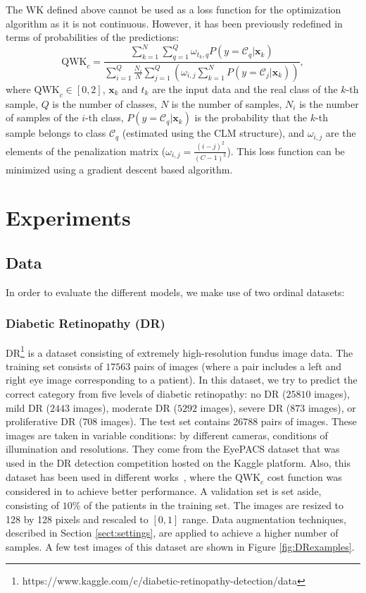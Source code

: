 \documentclass[journal]{IEEEtran}
\begin{document}
	The WK defined above cannot be used as a loss function for the optimization algorithm as it is not continuous. However, it has been previously redefined \cite{de2018weighted} in terms of probabilities of the predictions:
	\begin{equation}
	\nonumber
	\text{QWK}_c = \frac{\sum\limits_{k=1}^N \sum\limits_{q=1}^Q \omega_{t_k, q} P(y = \mathcal{C}_q | \mathbf{x}_k)}{\sum\limits_{i=1}^Q \frac{N_i}{N} \sum\limits_{j=1}^Q ( \omega_{i,j} \sum\limits_{k=1}^N P(y = \mathcal{C}_j | \mathbf{x}_k))},
	\end{equation}
	where $\text{QWK}_c \in [0,2]$, $\mathbf{x}_k$ and $t_k$ are the input data and the real class of the $k$-th sample, $Q$ is the number of classes, $N$ is the number of samples, $N_i$ is the number of samples of the $i$-th class, $P(y = \mathcal{C}_q | \mathbf{x}_k)$ is the probability that the $k$-th sample belongs to class $\mathcal{C}_q$ (estimated using the CLM structure), and $\omega_{i,j}$ are the elements of the penalization matrix ($\omega_{i,j} = \frac{(i-j)^2}{(C-1)^2}$). This loss function can be minimized using a gradient descent based algorithm.
	
	\section{Experiments}
	\label{sect:experiments}
	\subsection{Data}
	In order to evaluate the different models, we make use of two ordinal datasets:
    \subsubsection{Diabetic Retinopathy (DR)}
    DR\footnote{https://www.kaggle.com/c/diabetic-retinopathy-detection/data} is a dataset consisting of extremely high-resolution fundus image data. The training set consists of $17563$ pairs of images (where a  pair includes a left and right eye image corresponding to a patient). In this dataset, we try to predict the correct category from five levels of diabetic retinopathy: no DR ($25810$ images), mild DR ($2443$ images), moderate DR ($5292$ images), severe DR ($873$ images), or proliferative DR ($708$ images). The test set contains $26788$ pairs of images. These images are taken in variable conditions: by different cameras,  conditions of illumination and resolutions. They come from the EyePACS dataset that was used in the DR detection competition hosted on the Kaggle platform. Also, this dataset has been used in different works~\cite{de2018weighted,nebot2016diabetic}, where the $\text{QWK}_c$ cost function was considered in \cite{de2018weighted} to achieve better performance. A validation set is set aside, consisting of $10\%$ of the patients in the training set. The images are resized to 128 by 128 pixels and rescaled to $[0,1]$ range. Data augmentation techniques, described in Section \ref{sect:settings}, are applied to achieve a higher number of samples. A few test images of this dataset are shown in Figure \ref{fig:DRexamples}.
		
\end{document}
